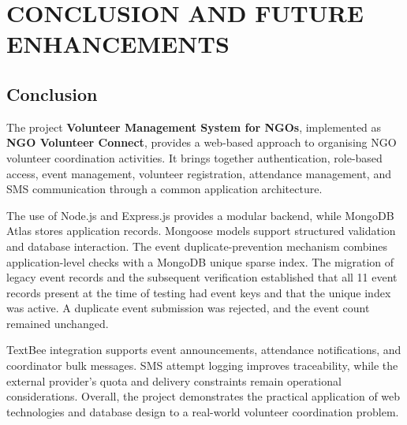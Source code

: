 \documentclass[12pt,a4paper,oneside]{report}
\newcommand{\projecttitle}{Volunteer Management System for NGOs}
\newcommand{\applicationname}{NGO Volunteer Connect}
\begin{document}
\chapter{CONCLUSION AND FUTURE ENHANCEMENTS}

\section{Conclusion}
The project \textbf{\projecttitle}, implemented as \textbf{\applicationname}, provides a web-based approach to organising NGO volunteer coordination activities. It brings together authentication, role-based access, event management, volunteer registration, attendance management, and SMS communication through a common application architecture.

The use of Node.js and Express.js provides a modular backend, while MongoDB Atlas stores application records. Mongoose models support structured validation and database interaction. The event duplicate-prevention mechanism combines application-level checks with a MongoDB unique sparse index. The migration of legacy event records and the subsequent verification established that all 11 event records present at the time of testing had event keys and that the unique index was active. A duplicate event submission was rejected, and the event count remained unchanged.

TextBee integration supports event announcements, attendance notifications, and coordinator bulk messages. SMS attempt logging improves traceability, while the external provider's quota and delivery constraints remain operational considerations. Overall, the project demonstrates the practical application of web technologies and database design to a real-world volunteer coordination problem.
\end{document}
